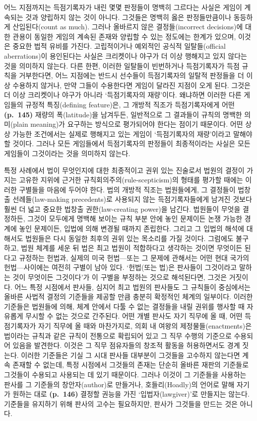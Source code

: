 어느 지점까지는 득점기록자가 내린 몇몇 판정들이 명백히 그르다는 사실은
게임이 계속되는 것과 양립하지 않는 것이 아니다. 그것들은 명백히 옳은
판정들만큼이나 동등하게 산입된다(count as much). 그러나 올바르지 않은
결정들(incorrect decisions)에 대한 관용이 동일한 게임의 계속된 존재와
양립할 수 있는 정도에는 한계가 있으며, 이것은 중요한 법적 유비를 가진다.
고립적이거나 예외적인 공식적 일탈들(official aberrations)이 용인된다는
사실은 크리켓이나 야구가 더 이상 행해지고 있지 않다는 것을 의미하지
않는다. 다른 한편, 이러한 일탈들이 빈번하거나 득점기록자가 득점 규칙을
거부한다면, 어느 지점에는 반드시 선수들이 득점기록자의 일탈적 판정들을
더 이상 수용하지 않거나, 만약 그들이 수용한다면 게임이 달라진 지점이
오게 된다. 그것은 더 이상 크리켓이나 야구가 아니라 ‘득점기록자의
재량’이다. 왜냐하면 이러한 다른 게임들의 규정적 특징(defining
feature)은, 그 개방적 직조가 득점기록자에게 어떤 \textbf{(p.~145)}
재량의 폭(latitude)을 남겨두든, 일반적으로 그 결과들이 규칙의 명백한
의미(plain meaning)가 요구하는 방식으로 평가되어야 한다는 점이기
때문이다. 어떤 상상 가능한 조건에서는 실제로 행해지고 있는 게임이
‘득점기록자의 재량’이라고 말해야 할 것이다. 그러나 모든 게임들에서
득점기록자의 판정들이 최종적이라는 사실은 모든 게임들이 그것이라는 것을
의미하지 않는다.

특정 사례에서 법이 무엇인지에 대한 최종적이고 권위 있는 진술로서 법원의
결정이 가지는 고유한 지위에 근거한 규칙회의주의(rule-scepticism)의
형태를 평가할 때에는 이러한 구별들을 마음에 두어야 한다. 법의 개방적
직조는 법원들에게, 그 결정들이 법창출 선례들(law-making precedents)로
사용되지 않는 득점기록자들에게 남겨진 것보다 훨씬 더 넓고 중요한 법창출
권한(law-creating power)을 남긴다. 법원들이 무엇을 결정하든, 그것이
모두에게 명백해 보이는 규칙 부분 안에 놓인 문제이든 논쟁 가능한 경계에
놓인 문제이든, 입법에 의해 변경될 때까지 존립한다. 그리고 그 입법의
해석에 대해서도 법원들은 다시 동일한 최후의 권위 있는 목소리를 가질
것이다. 그럼에도 불구하고, 법원 체계를 세운 뒤 법은 최고 법원이
적합하다고 생각하는 것이면 무엇이든 된다고 규정하는 헌법과, 실제의 미국
헌법---또는 그 문제에 관해서는 어떤 현대 국가의 헌법---사이에는 여전히
구별이 남아 있다. ‘헌법(또는 법)은 판사들이 그것이라고 말하는 것이
무엇이든 그것이다’가 이 구별을 부정하는 것으로 해석된다면, 그것은
거짓이다. 어느 특정 시점에서 판사들, 심지어 최고 법원의 판사들도 그
규칙들이 중심에서는 올바른 사법적 결정의 기준들을 제공할 만큼 충분히
확정적인 체계의 일부이다. 이러한 기준들은 법원들에 의해, 체계 안에서
다툴 수 없는 결정들을 내릴 권위를 행사할 때 자유롭게 무시할 수 없는
것으로 간주된다. 어떤 개별 판사도 자기 직무에 올 때, 어떤 득점기록자가
자기 직무에 올 때와 마찬가지로, 의회 내 여왕의 제정물들(enactments)은
법이라는 규칙과 같은 규칙이 전통으로 확립되어 있고 그 직무 수행의
기준으로 수용되어 있음을 발견한다. 이것은 그 직무 점유자들의 창조적
활동을 허용하면서도 경계 짓는다. 이러한 기준들은 기실 그 시대 판사들
대부분이 그것들을 고수하지 않는다면 계속 존재할 수 없는데, 특정 시점에서
그것들의 존재는 단순히 올바른 재판의 기준들로 그것들이 수용되고 사용되는
데 있기 때문이다. 그러나 이것이 그 기준들을 사용하는 판사를 그 기준들의
창안자(author)로 만들거나, 호들리(Hoadly)의 언어로 말해 자기가 원하는
대로 \textbf{(p.~146)} 결정할 권능을 가진 ‘입법자(lawgiver)’로 만들지는
않는다. 기준들을 유지하기 위해 판사의 고수는 필요하지만, 판사가 그것들을
만드는 것은 아니다.

